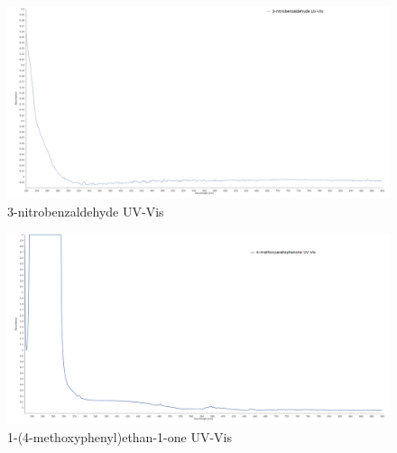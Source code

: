 \documentclass[11pt]{article}
\begin{document}
\newpage
\begin{figure}[H]
    \centering
    \includegraphics[scale=0.234]{spectra/uvvis4.1.png}
    \caption{3-nitrobenzaldehyde UV-Vis}    
\end{figure}
\begin{figure}[H]
    \centering
    \includegraphics[scale=0.234]{spectra/uvvis5.1.png}
    \caption{1-(4-methoxyphenyl)ethan-1-one UV-Vis}    
\end{figure}
\end{document}
